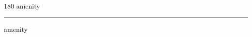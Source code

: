 
\begin{frame}
\begin{center}
\begin{turn}{180}
{\fontsize{2.5cm}{1em}\selectfont amenity}
\end{turn}
\vspace{1em}\par  
\hrule
\vspace{1em}\par  
{\fontsize{2.5cm}{1em}\selectfont amenity}
\end{center}
\end{frame}
